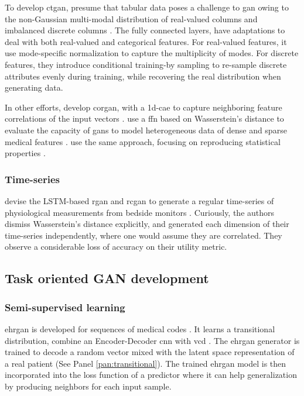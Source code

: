             To develop \gls{ctgan}, \citeauthor{Xu2019-ay} presume that tabular data poses a challenge to \gls{gan} owing to the non-Gaussian multi-modal distribution of real-valued columns and imbalanced discrete columns \cite{Xu2019-ay}. The fully connected layers, have adaptations to deal with both real-valued and categorical features. For real-valued features, it use mode-specific normalization to capture the multiplicity of modes. For discrete features, they introduce conditional training-by sampling to re-sample discrete attributes evenly during training, while recovering the real distribution when generating data.\par
            
            In other efforts, \citeauthor{torfi2019generating} develop \gls{corgan}, with a \gls{1d-cae} to capture neighboring feature correlations of the input vectors \cite{torfi2019generating}. \citeauthor{chincheong2020generation} use a \gls{ffn} based on Wasserstein's distance to evaluate the capacity of \glspl{gan} to model heterogeneous data of dense and sparse medical features \cite{chincheong2020generation}. \citeauthor{ozyigit2020generation} use the same approach, focusing on reproducing statistical properties \cite{ozyigit2020generation}.
            
        \subsubsection{Time-series}
            
             \citeauthor{esteban2017real} devise the LSTM-based \gls{rgan} and \gls{rcgan} to generate a regular time-series of physiological measurements from bedside monitors \cite{esteban2017real}. Curiously, the authors dismiss Wasserstein's distance explicitly, and generated each dimension of their time-series independently, where one would assume they are correlated. They observe a considerable loss of accuracy  on their utility metric. 

    \subsection{Task oriented GAN development}
        \subsubsection{Semi-supervised learning}

            \gls{ehrgan} is developed for sequences of medical codes \citeauthor{Che_2017}. It learns a transitional distribution, combine an Encoder-Decoder \gls{cnn} \cite{Rankin2020} with \gls{vcd} \cite{Che_2017}. The \gls{ehrgan} generator is trained to decode a random vector mixed with the latent space representation of a real patient (See Panel \ref{pan:transitional}). The trained \gls{ehrgan} model is then incorporated into the loss function of a predictor where it can help generalization by producing neighbors for each input sample.\par
            
